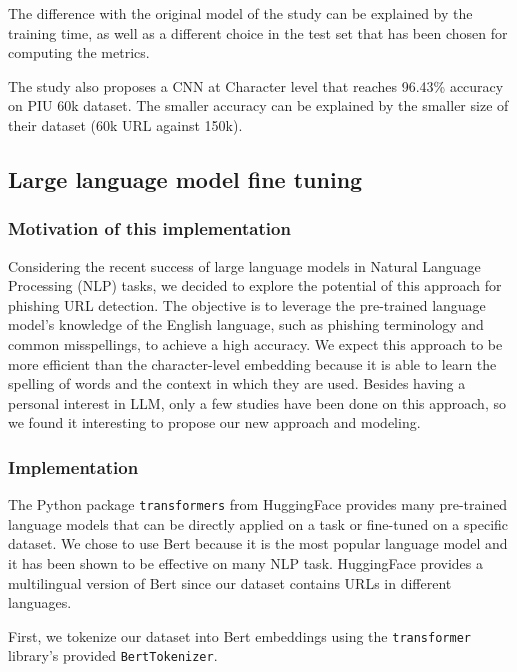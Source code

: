 \documentclass{article}
\begin{document}
    The difference with the original model of the study can be explained by the training time, as well as a different choice in the test set that has been chosen for computing the metrics.

    The study\cite{PhishingLoginURLDetection} also proposes a CNN at Character level that reaches 96.43\% accuracy on PIU 60k dataset.
    The smaller accuracy can be explained by the smaller size of their dataset (60k URL against 150k).

    \subsection{Large language model fine tuning}\label{subsec:large-language-model-finetuning}

    \subsubsection{Motivation of this implementation}

    Considering the recent success of large language models in Natural Language Processing (NLP) tasks, we decided to explore the potential of this approach for phishing URL detection. The objective is to leverage the pre-trained language model's knowledge of the English language, such as phishing terminology and common misspellings, to achieve a high accuracy. We expect this approach to be more efficient than the character-level embedding because it is able to learn the spelling of words and the context in which they are used. Besides having a personal interest in LLM, only a few studies have been done on this approach, so we found it interesting to propose our new approach and modeling.

    \subsubsection{Implementation}

    The Python package \texttt{transformers} from HuggingFace provides many pre-trained language models that can be directly applied on a task or fine-tuned on a specific dataset. We chose to use Bert because it is the most popular language model and it has been shown to be effective on many NLP task. HuggingFace provides a multilingual version of Bert since our dataset contains URLs in different languages.

    First, we tokenize our dataset into Bert embeddings using the \texttt{transformer} library's provided \texttt{BertTokenizer}.
\end{document}
